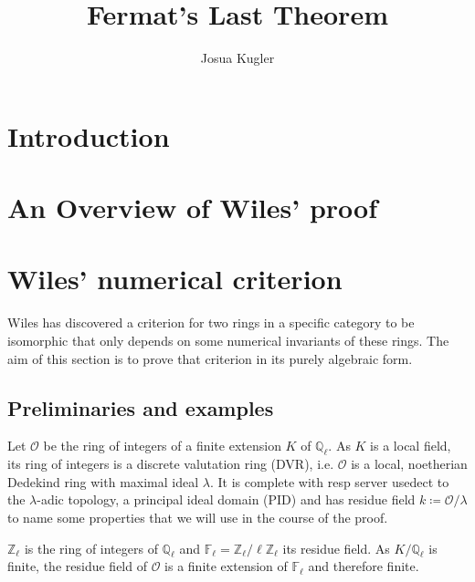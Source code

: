 \documentclass{article}
\title{Fermat's Last Theorem}
\author{Josua Kugler}
\theoremstyle{plain}%
\theoremstyle{definition}
\theoremstyle{remark}
\begin{document}
\maketitle
\tableofcontents
\section{Introduction}
\section{An Overview of Wiles' proof}
\newpage
\section{Wiles' numerical criterion}
Wiles has discovered a criterion for two rings in a specific category to be isomorphic 
that only depends on some numerical invariants of these rings. 
The aim of this section is to prove that criterion in its purely algebraic form. 

\subsection{Preliminaries and examples}
Let \(\mathcal{O}\) be the ring of integers of a finite extension \(K\) of \(\mathbb Q_\ell\). 
As \(K\) is a local field, its ring of integers is a discrete valutation ring (DVR), i.e. 
\(\mathcal O\) is a local, noetherian Dedekind ring with maximal ideal \(\lambda\). 
It is complete with resp server usedect to the \(\lambda\)-adic topology, a principal ideal domain (PID) 
and has residue field \(k \coloneqq \mathcal{O}/\lambda\) 
to name some properties that we will use in the course of the proof.

\(\mathbb Z_\ell\) is the ring of integers of \(\mathbb Q_\ell\) and 
\(\mathbb F_\ell = \mathbb Z_\ell/\ell \mathbb Z_\ell\) its residue field. 
As \(K/\mathbb{Q}_\ell\) is finite, the residue field of \(\mathcal{O}\) 
is a finite extension of $\mathbb F_\ell$ and therefore finite. 
\end{document}

